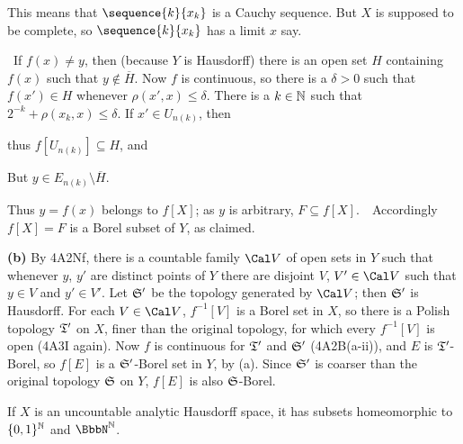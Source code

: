 {\noindent This means that $\sequence{k}{x_k}$ is a Cauchy sequence.
But $X$ is supposed to be complete, so $\sequence{k}{x_k}$ has a limit
$x$ say.

\Quer\ If $f(x)\ne y$, then (because $Y$ is Hausdorff) there is an open
set $H$ containing $f(x)$ such that $y\notin\overline{H}$.   Now $f$ is
continuous, so there is a $\delta>0$ such that $f(x')\in H$ whenever
$\rho(x',x)\le\delta$.   There is a $k\in\Bbb N$ such that
$2^{-k}+\rho(x_k,x)\le\delta$.   If $x'\in U_{n(k)}$, then


\noindent thus $f[U_{n(k)}]\subseteq H$, and


\noindent But $y\in E_{n(k)}\setminus\overline{H}$.\ \Bang

Thus $y=f(x)$ belongs to $f[X]$;  as $y$ is arbitrary, $F\subseteq
f[X]$.\ \QeD\  Accordingly $f[X]=F$ is a Borel subset of $Y$, as
claimed.

\medskip

{\bf (b)} By 4A2Nf, there is a countable family $\Cal V$ of open sets in
$Y$ such that whenever $y$, $y'$ are distinct points of $Y$ there are
disjoint $V$, $V'\in\Cal V$ such that $y\in V$ and $y'\in V'$.   Let
$\frak S'$ be the topology generated by $\Cal V$;  then $\frak S'$ is
Hausdorff.   For each $V\in\Cal V$, $f^{-1}[V]$ is a Borel set in $X$,
so there is a Polish topology $\frak T'$ on $X$, finer than the original
topology, for which every $f^{-1}[V]$ is open (4A3I again).
Now $f$ is continuous for $\frak T'$ and
$\frak S'$ (4A2B(a-ii)), and $E$ is $\frak T'$-Borel, so $f[E]$ is a
$\frak S'$-Borel set in $Y$, by (a).   Since $\frak S'$ is coarser than
the original topology $\frak S$ on $Y$, $f[E]$ is also $\frak S$-Borel.
}%

 If $X$ is an uncountable analytic Hausdorff space,
it has subsets homeomorphic to $\{0,1\}^{\Bbb N}$ and $\NN$.

